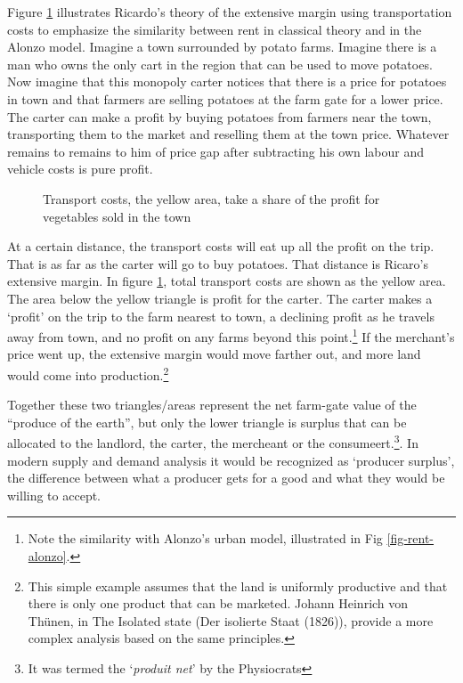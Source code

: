 Figure \ref{fig-rent-ricardo} illustrates Ricardo's theory of the extensive margin using transportation costs to emphasize the similarity between rent in classical theory and in  the Alonzo model. Imagine a town surrounded by potato farms. Imagine there is a man who owns the only cart in the region that can be used to move potatoes. Now imagine that this monopoly carter notices that there is a price for potatoes in town and that farmers are selling potatoes at the farm gate for a lower price. The carter can  make a profit by buying potatoes from farmers near the town, transporting them to the market  and reselling them  at the town price. Whatever remains to remains to him of price gap after subtracting his own labour and vehicle costs is pure profit.  

\begin{figure}[htb]
    \begin{center}
    
    \caption{Transport costs, the yellow area, take a share of the profit for vegetables sold in the town}
    \label{fig-rent-ricardo}
    \end{center}
\end{figure}

At a certain distance, the transport costs will eat up all the profit on the trip. That is as far as the carter will go to buy potatoes. That distance is Ricaro's extensive margin. In figure \ref{fig-rent-ricardo}, total transport costs are shown as the yellow area. The area below the yellow triangle is profit for the carter. The carter makes a `profit' on the trip to the farm nearest to town, a declining profit as he travels away from town, and  no profit on any farms beyond this point.\footnote{Note the similarity with Alonzo's urban model, illustrated in Fig \ref{fig-rent-alonzo}.}
If the merchant's price went up, the extensive margin would move farther out, and more land would come into production.\footnote{This simple example assumes that the land is uniformly productive and that there is only one product that can be marketed. Johann Heinrich von Th\"unen, in The Isolated state (Der isolierte Staat (1826)), provide a more complex analysis based on the same principles.} 

Together these two triangles/areas represent the net farm-gate value of the ``produce of the earth'', but only the lower triangle is surplus that can be allocated to the landlord, the carter, the mercheant or the consumeert.\footnote{It was termed the `\textit{produit net}' by the Physiocrats}. In modern supply and demand analysis it would be recognized as `producer surplus', the difference between what a producer gets for a good and what they would be willing to accept.

